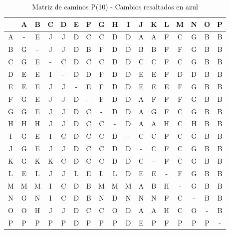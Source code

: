 \documentclass[12pt]{article}
\begin{document}
\begin{table}[h!]
\centering
\begin{tabular}{|c|c|c|c|c|c|c|c|c|c|c|c|c|c|c|c|c|}
\hline
 & A & B & C & D & E & F & G & H & I & J & K & L & M & N & O & P \\\hline
A & - & \cellcolor{lightblue} E & \cellcolor{lightblue} J & \cellcolor{lightblue} J & \cellcolor{lightblue} D & \cellcolor{lightblue} C & \cellcolor{lightblue} C & \cellcolor{lightblue} D & \cellcolor{lightblue} D & A & A & \cellcolor{lightblue} F & \cellcolor{lightblue} C & \cellcolor{lightblue} G & \cellcolor{lightblue} B & \cellcolor{lightblue} B \\\hline
B & G & - & \cellcolor{lightblue} J & \cellcolor{lightblue} J & D & B & F & D & D & B & B & F & F & G & B & B \\\hline
C & G & E & - & C & D & C & C & D & D & C & C & F & C & G & B & B \\\hline
D & E & E & I & - & D & D & F & D & D & E & E & F & D & D & B & B \\\hline
E & E & E & \cellcolor{lightblue} J & \cellcolor{lightblue} J & - & E & F & D & D & E & E & E & F & G & B & B \\\hline
F & G & E & \cellcolor{lightblue} J & \cellcolor{lightblue} J & D & - & F & D & D & A & F & F & F & G & B & B \\\hline
G & G & E & \cellcolor{lightblue} J & \cellcolor{lightblue} J & D & C & - & D & D & A & G & F & C & G & B & B \\\hline
H & H & H & \cellcolor{lightblue} J & \cellcolor{lightblue} J & D & \cellcolor{lightblue} C & \cellcolor{lightblue} C & - & D & A & A & H & \cellcolor{lightblue} C & H & B & B \\\hline
I & G & E & I & C & D & C & C & D & - & C & C & F & C & G & B & B \\\hline
J & G & E & J & J & D & C & C & D & D & - & C & F & C & G & B & B \\\hline
K & G & K & K & C & D & C & C & D & D & C & - & F & C & G & B & B \\\hline
L & E & L & \cellcolor{lightblue} J & \cellcolor{lightblue} J & L & E & L & L & D & E & E & - & F & G & B & B \\\hline
M & M & M & I & C & D & B & M & M & M & A & B & H & - & G & B & B \\\hline
N & G & N & I & C & D & B & N & D & N & N & N & F & C & - & B & B \\\hline
O & O & H & \cellcolor{lightblue} J & \cellcolor{lightblue} J & D & \cellcolor{lightblue} C & \cellcolor{lightblue} C & O & D & A & A & H & \cellcolor{lightblue} C & O & - & B \\\hline
P & P & P & P & P & D & P & P & P & D & E & P & F & P & P & P & - \\\hline
\end{tabular}
\caption{Matriz de caminos P(10) - Cambios resaltados en azul}
\end{table}
\end{document}
